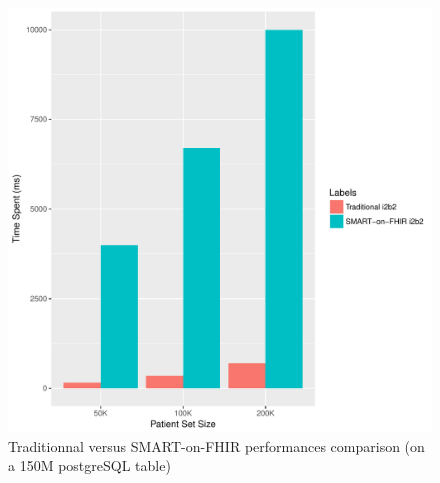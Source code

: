 \documentclass{amia}
\begin{document}
\begin{figure}[h!]
\centering
\includegraphics[scale=.7]{graph2.pdf}
	\caption{Traditionnal versus SMART-on-FHIR performances comparison (on a 150M postgreSQL table)}
\label{fig1}
\end{figure}
\end{document}

